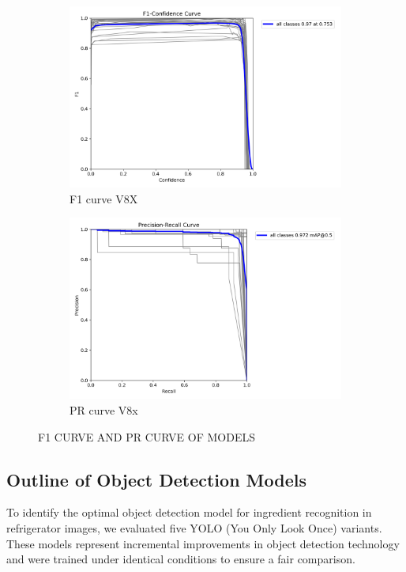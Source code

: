 \documentclass[letterpaper,11pt]{report}
\begin{document}
\begin{figure}[h!]
    \begin{subfigure}[t]{0.4\textwidth}
        \centering
        \includegraphics[width=\textwidth]{F1_curve_v8X.png}
        \caption{F1 curve V8X}
        \label{fig:image9}
    \end{subfigure}
    \hfill
    \begin{subfigure}[t]{0.4\textwidth}
        \centering
        \includegraphics[width=\textwidth]{PR_curve_v8x.png}
        \caption{PR curve V8x}
        \label{fig:image10}
    \end{subfigure}
    
    \caption{F1 CURVE AND PR CURVE OF MODELS}
    \label{fig:result_grid}
\end{figure}



\subsection{Outline of Object Detection Models}
To identify the optimal object detection model for ingredient recognition in refrigerator images, we evaluated five YOLO (You Only Look Once) variants. These models represent incremental improvements in object detection technology and were trained under identical conditions to ensure a fair comparison. 
\end{document}
